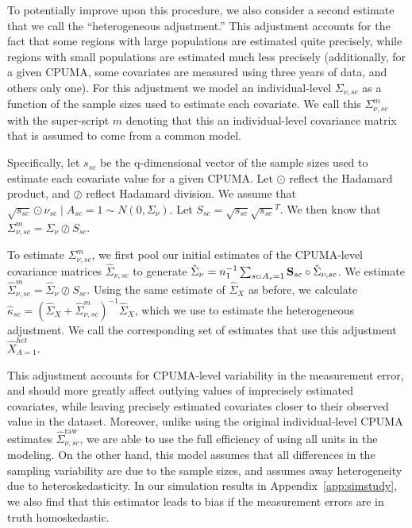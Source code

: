 To potentially improve upon this procedure, we also consider a second estimate that we call the ``heterogeneous adjustment.'' This adjustment accounts for the fact that some regions with large populations are estimated quite precisely, while regions with small populations are estimated much less precisely (additionally, for a given CPUMA, some covariates are measured using three years of data, and others only one). For this adjustment we model an individual-level $\Sigma_{\nu, sc}$ as a function of the sample sizes used to estimate each covariate. We call this $\Sigma_{\nu, sc}^m$ with the super-script $m$ denoting that this an individual-level covariance matrix that is assumed to come from a common model. 

Specifically, let $s_{sc}$ be the q-dimensional vector of the sample sizes used to estimate each covariate value for a given CPUMA. Let $\odot$ reflect the Hadamard product, and $\oslash$ reflect Hadamard division. We assume that $\sqrt{s_{sc}} \odot \nu_{sc} \mid A_{sc} = 1 \sim N(0, \Sigma_{\nu})$. Let $S_{sc} = \sqrt{s_{sc}}\sqrt{s_{sc}}^T$. We then know that $\Sigma_{\nu, sc}^m = \Sigma_{\nu} \oslash S_{sc}$.

To estimate $\Sigma_{\nu, sc}^m$, we first pool our initial estimates of the CPUMA-level covariance matrices $\hat{\Sigma}_{\nu, sc}$ to generate $\hat{\Sigma}_{\nu} = n_1^{-1}\sum_{sc: A_s = 1} \mathbf{S}_{sc} \circ \hat{\Sigma}_{\nu, sc}$. We estimate $\hat{\Sigma}_{\nu, sc}^m = \hat{\Sigma}_{\nu} \oslash S_{sc}$. Using the same estimate of $\hat{\Sigma}_X$ as before, we calculate $\hat{\kappa}_{sc} = (\hat{\Sigma}_{X} + \hat{\Sigma}_{\nu, sc}^m)^{-1}\hat{\Sigma}_X$, which we use to estimate the heterogeneous adjustment. We call the corresponding set of estimates that use this adjustment $\hat{X}_{A=1}^{het}$.

This adjustment accounts for CPUMA-level variability in the measurement error, and should more greatly affect outlying values of imprecisely estimated covariates, while leaving precisely estimated covariates closer to their observed value in the dataset. Moreover, unlike using the original individual-level CPUMA estimates $\hat{\Sigma}_{\nu, sc}^{\text{raw}}$, we are able to use the full efficiency of using all units in the modeling. On the other hand, this model assumes that all differences in the sampling variability are due to the sample sizes, and assumes away heterogeneity due to heteroskedasticity. In our simulation results in Appendix~\ref{app:simstudy}, we also find that this estimator leads to bias if the measurement errors are in truth homoskedastic. 

